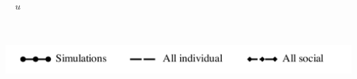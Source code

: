 \documentclass[varwidth=true,crop=false]{standalone}
\begin{document}
\begin{minipage}{3.75in}
      \\[-2.75em]
      \begin{center}
        {\huge $\quad u$}
      \end{center}
    \end{minipage} \\[1em]

    \begin{center}
    \includegraphics[width=6in]{Figures/payoffs_legend.pdf}
  \end{center}
\end{document}
